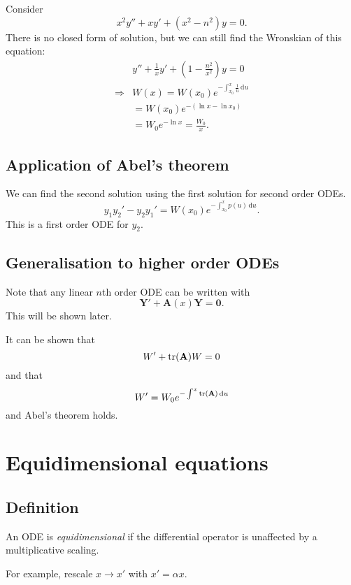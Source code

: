 \documentclass[10pt]{article}
\begin{document}
    \begin{example}
        Consider
        \[
            x^2y''+xy'+(x^2-n^2)y=0
        .\]
        There is no closed form of solution, but we can still find the Wronskian of this equation:
        \[
            \begin{aligned}
                &y''+\frac{1}{x}y'+\left( 1-\frac{n^2}{x^2} \right) y=0\\
                \Longrightarrow &W(x)=W(x_0) e^{-\int_{x_0}^{x} \frac{1}{u} \,\mathrm{d}u}\\
                &=W(x_0) e^{-(\ln x-\ln x_0)}\\
                &= W_0 e^{-\ln x}=\frac{W_0}{x}.
            \end{aligned}
        \]
    \end{example}
    \subsection{Application of Abel's theorem}
    We can find the second solution using the first solution for second order ODEs.
    \[
        y_1y_2'-y_2y_1'=W(x_0)e^{-\int_{x_0}^{x} p(u) \,\mathrm{d}u}
    .\]
    This is a first order ODE for $y_2$.
    \subsection{Generalisation to higher order ODEs}
    Note that any linear $n$th order ODE can be written with 
    \[
        \mathbf{Y}'+\mathbf{A}(x)\mathbf{Y}=\mathbf{0}
    .\]
    This will be shown later.

    It can be shown that 
    \[
        W'+\trace(\bfA)W=0
    \]
    and that 
    \[
        W'=W_0e^{-\int^{x} \trace(\mathbf{A}) \,\mathrm{d}u}
    \]
    and Abel's theorem holds.
    \section{Equidimensional equations}
    \subsection{Definition}
    \begin{definition}
        An ODE is \textit{equidimensional} if the differential operator is unaffected by a multiplicative scaling.
    \end{definition}
    For example, rescale $ x \to x' $ with $ x'=\alpha x $.
\end{document}
